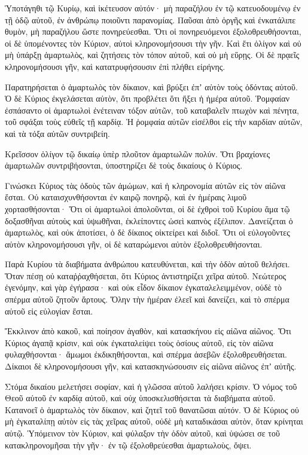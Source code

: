 \begin{spacing}{1.1}
\begin{multicols}{2}
Ὑποτάγηθι τῷ Κυρίῳ, καὶ ἱκέτευσον αὐτόν· μὴ παραζήλου ἐν τῷ κατευοδουμένῳ ἐν τῇ ὁδῷ αὐτοῦ, ἐν ἀνθρώπῳ ποιοῦντι παρανομίας.
Παῦσαι ἀπὸ ὀργῆς καὶ ἐνκατάλιπε θυμὸν, μὴ παραζήλου ὥστε πονηρεύεσθαι.
Ὅτι οἱ πονηρευόμενοι ἐξολοθρευθήσονται, οἱ δὲ ὑπομένοντες τὸν Κύριον, αὐτοὶ κληρονομήσουσι τὴν γῆν.
Καὶ ἔτι ὀλίγον καὶ οὐ μὴ ὑπάρξῃ ἁμαρτωλὸς, καὶ ζητήσεις τὸν τόπον αὐτοῦ, καὶ οὐ μὴ εὕρῃς.
Οἱ δὲ πρᾳεῖς κληρονομήσουσι γῆν, καὶ κατατρυφήσουσιν ἐπὶ πλήθει εἰρήνης.

Παρατηρήσεται ὁ ἁμαρτωλὸς τὸν δίκαιον, καὶ βρύξει ἐπʼ αὐτὸν τοὺς ὀδόντας αὐτοῦ.
Ὁ δὲ Κύριος ἐκγελάσεται αὐτὸν, ὅτι προβλέτει ὅτι ἥξει ἡ ἡμέρα αὐτοῦ.
Ῥομφαίαν ἐσπάσαντο οἱ ἁμαρτωλοὶ ἐνέτειναν τόξον αὐτῶν, τοῦ καταβαλεῖν πτωχὸν καὶ πένητα, τοῦ σφάξαι τοὺς εὐθεῖς τῇ καρδίᾳ.
Ἡ ῥομφαία αὐτῶν εἰσέλθοι εἰς τὴν καρδίαν αὐτῶν, καὶ τὰ τόξα αὐτῶν συντριβείη.

Κρεῖσσον ὀλίγον τῷ δικαίῳ ὑπὲρ πλοῦτον ἁμαρτωλῶν πολύν.
Ὅτι βραχίονες ἁμαρτωλῶν συντριβήσονται, ὑποστηρίζει δὲ τοὺς δικαίους ὁ Κύριος.

Γινώσκει Κύριος τὰς ὁδοὺς τῶν ἀμώμων, καὶ ἡ κληρονομία αὐτῶν εἰς τὸν αἰῶνα ἔσται.
Οὐ καταισχυνθήσονται ἐν καιρῷ πονηρῷ, καὶ ἐν ἡμέραις λιμοῦ χορτασθήσονται·
Ὅτι οἱ ἁμαρτωλοὶ ἀπολοῦνται, οἱ δὲ ἐχθροὶ τοῦ Κυρίου ἅμα τῷ δοξασθῆναι αὐτοὺς καὶ ὑψωθῆναι, ἐκλείποντες ὡσεὶ καπνὸς ἐξέλιπον.
Δανείζεται ὁ ἁμαρτωλὸς, καὶ οὐκ ἀποτίσει, ὁ δὲ δίκαιος οἰκτείρει καὶ διδοῖ.
Ὅτι οἱ εὐλογοῦντες αὐτὸν κληρονομήσουσι γῆν, οἱ δὲ καταρώμενοι αὐτὸν ἐξολοθρευθήσονται.

Παρὰ Κυρίου τὰ διαβήματα ἀνθρώπου κατευθύνεται, καὶ τὴν ὁδὸν αὐτοῦ θελήσει.
Ὅταν πέσῃ οὐ καταῤῥαχθήσεται, ὅτι Κύριος ἀντιστηρίζει χεῖρα αὐτοῦ.
Νεώτερος ἐγενόμην, καὶ γὰρ ἐγήρασα· καὶ οὐκ εἶδον δίκαιον ἐγκαταλελειμμένον, οὐδὲ τὸ σπέρμα αὐτοῦ ζητοῦν ἄρτους.
Ὅλην τὴν ἡμέραν ἐλεεῖ καὶ δανείζει, καὶ τὸ σπέρμα αὐτοῦ εἰς εὐλογίαν ἔσται.

Ἔκκλινον ἀπὸ κακοῦ, καὶ ποίησον ἀγαθὸν, καὶ κατασκήνου εἰς αἰῶνα αἰῶνος.
Ὅτι Κύριος ἀγαπᾷ κρίσιν, καὶ οὐκ ἐγκαταλείψει τοὺς ὁσίους αὐτοῦ, εἰς τὸν αἰῶνα φυλαχθήσονται· ἄμωμοι ἐκδικηθήσονται, καὶ σπέρμα ἀσεβῶν ἐξολοθρευθήσεται.
Δίκαιοι δὲ κληρονομήσουσι γῆν, καὶ κατασκηνώσουσιν εἰς αἰῶνα αἰῶνος ἐπʼ αὐτῆς.

Στόμα δικαίου μελετήσει σοφίαν, καὶ ἡ γλῶσσα αὐτοῦ λαλήσει κρίσιν.
Ὁ νόμος τοῦ Θεοῦ αὐτοῦ ἐν καρδίᾳ αὐτοῦ, καὶ οὐχ ὑποσκελισθήσεται τὰ διαβήματα αὐτοῦ.
Κατανοεῖ ὁ ἁμαρτωλὸς τὸν δίκαιον, καὶ ζητεῖ τοῦ θανατῶσαι αὐτόν.
Ὁ δὲ Κύριος οὐ μὴ ἐγκαταλίπῃ αὐτὸν εἰς τὰς χεῖρας αὐτοῦ, οὐδὲ μὴ καταδικάσαι αὐτὸν, ὅταν κρίνηται αὐτῷ.
Ὑπόμεινον τὸν Κύριον, καὶ φύλαξον τὴν ὁδὸν αὐτοῦ, καὶ ὑψώσει σε τοῦ κατακληρονομῆσαι τὴν γῆν· ἐν τῷ ἐξολοθρεύεσθαι ἁμαρτωλοὺς, ὄψει.


\end{multicols}
\end{spacing}
